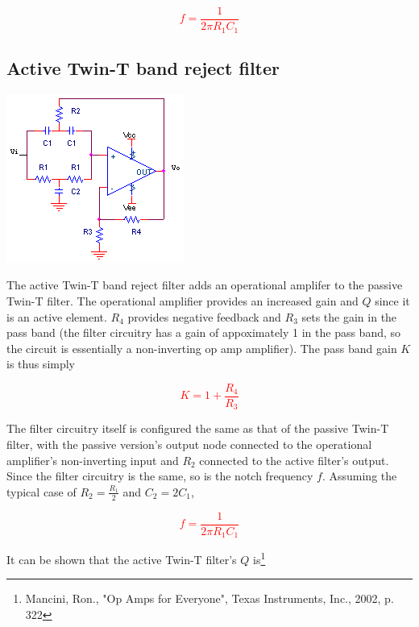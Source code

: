 \textcolor{red}{
\begin{equation}
f = \frac{1}{2\pi R_{1}C_{1}}
\label{eq:passiveWienRobinson}
\end{equation}
}

\subsection{Active Twin-T band reject filter}
\begin{center}
	\includegraphics{schematics/activeTwinTbandrejectfilter.PNG}
\end{center}
The active Twin-T band reject filter adds an operational amplifer to the passive Twin-T filter. The operational amplifier provides an increased gain and $Q$ since it is an active element. $R_{4}$ provides negative feedback and $R_{3}$ sets the gain in the pass band (the filter circuitry has a gain of appoximately 1 in the pass band, so the circuit is essentially a non-inverting op amp amplifier). The pass band gain $K$ is thus simply

\textcolor{red}{
\begin{equation}
K = 1 + \frac{R_{4}}{R_{3}}
\end{equation}
}

The filter circuitry itself is configured the same as that of the passive Twin-T filter, with the passive version's output node connected to the operational amplifier's non-inverting input and $R_{2}$ connected to the active filter's output. Since the filter circuitry is the same, so is the notch frequency $f$. Assuming the typical case of $R_{2} = \frac{R_{1}}{2}$ and $C_{2} = 2C_{1}$,

\textcolor{red}{
\begin{equation}
f = \frac{1}{2\pi R_{1}C_{1}}
\end{equation}
}

It can be shown that the active Twin-T filter's $Q$ is\footnote{Mancini, Ron., "Op Amps for Everyone", Texas Instruments, Inc., 2002, p. 322}

